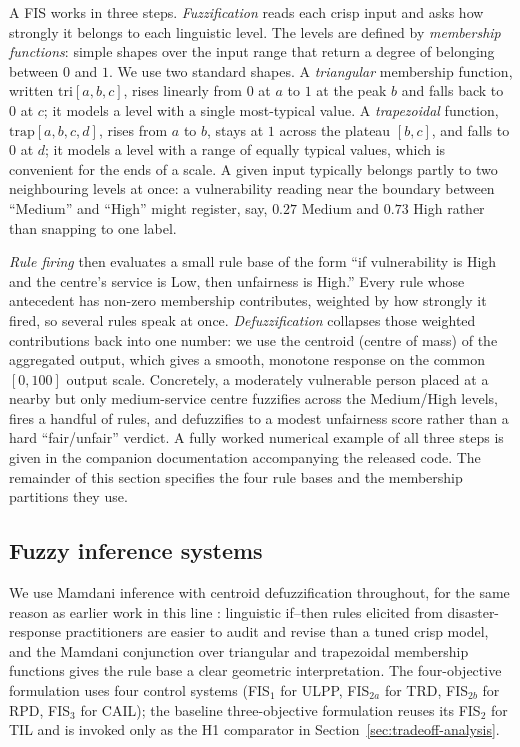 \documentclass[applsci,article,submit,moreauthors,pdftex]{Definitions/mdpi}
\begin{document}
A FIS works in three steps. \emph{Fuzzification} reads each crisp input and asks
how strongly it belongs to each linguistic level. The levels are defined by
\emph{membership functions}: simple shapes over the input range that return a
degree of belonging between $0$ and $1$. We use two standard shapes. A
\emph{triangular} membership function, written $\mathrm{tri}[a,b,c]$, rises
linearly from $0$ at $a$ to $1$ at the peak $b$ and falls back to $0$ at $c$; it
models a level with a single most-typical value. A \emph{trapezoidal} function,
$\mathrm{trap}[a,b,c,d]$, rises from $a$ to $b$, stays at $1$ across the plateau
$[b,c]$, and falls to $0$ at $d$; it models a level with a range of equally
typical values, which is convenient for the ends of a scale. A given input
typically belongs partly to two neighbouring levels at once: a vulnerability
reading near the boundary between ``Medium'' and ``High'' might register, say,
$0.27$ Medium and $0.73$ High rather than snapping to one label.

\emph{Rule firing} then evaluates a small rule base of the form ``if vulnerability
is High and the centre's service is Low, then unfairness is High.'' Every rule
whose antecedent has non-zero membership contributes, weighted by how strongly it
fired, so several rules speak at once. \emph{Defuzzification} collapses those
weighted contributions back into one number: we use the centroid (centre of mass)
of the aggregated output, which gives a smooth, monotone response on the common
$[0,100]$ output scale. Concretely, a moderately vulnerable person placed at a
nearby but only medium-service centre fuzzifies across the Medium/High levels,
fires a handful of rules, and defuzzifies to a modest unfairness score rather
than a hard ``fair/unfair'' verdict. A fully worked numerical example of all
three steps is given in the companion documentation accompanying the released
code. The remainder of this section specifies the four rule bases and the
membership partitions they use.

\subsection{Fuzzy inference systems}\label{sec:algo-fis}

We use Mamdani inference \cite{mamdani1975} with centroid defuzzification
throughout, for the same reason as earlier work in this line
\cite{rabiei2021, rabiei2023}: linguistic
if--then rules elicited from disaster-response practitioners are easier to
audit and revise than a tuned crisp model, and the Mamdani conjunction over
triangular and trapezoidal membership functions gives the rule base a clear
geometric interpretation. The four-objective formulation uses four control
systems (FIS$_1$ for ULPP, FIS$_{2a}$ for TRD, FIS$_{2b}$ for RPD, FIS$_3$
for CAIL); the baseline three-objective formulation reuses its FIS$_2$ for
TIL and is invoked only as the H1 comparator in
Section~\ref{sec:tradeoff-analysis}.
\end{document}
